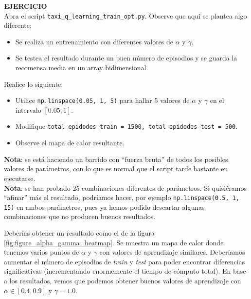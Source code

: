 \documentclass{article}
\begin{document}
\begin{exercise}
\textbf{EJERCICIO}\\
Abra el script \texttt{taxi\_q\_learning\_train\_opt.py}. Observe que aquí se plantea algo diferente: 
\begin{itemize}
    \item Se realiza un entrenamiento con diferentes valores de $\alpha$ y $\gamma$.
    \item Se testea el resultado durante un buen número de episodios y se guarda la recomensa media en un array bidimensional.
\end{itemize}

Realice lo siguiente:
\begin{itemize}
    \item Utilice \texttt{np.linspace(0.05, 1, 5)} para hallar 5 valores de $\alpha$ y $\gamma$ en el intervalo $[0.05, 1]$.
    \item Modifique \texttt{total\_epidodes\_train = 1500, total\_epidodes\_test = 500}.
    \item Observe el mapa de calor resultante.
\end{itemize}
\textbf{Nota}: se está haciendo un barrido con ``fuerza bruta'' de todos los posibles valores de parámetros, con lo que es normal que el script tarde bastante en ejecutarse.\\
\textbf{Nota}: se han probado 25 combinaciones diferentes de parámetros. Si quisiéramos ``afinar'' más el resultado, podríamos hacer, por ejemplo \texttt{np.linspace(0.5, 1, 15)} en ambos parámetros, pues ya hemos podido descartar algunas combinaciones que no producen buenos resultados.
\end{exercise}

Deberías obtener un resultado como el de la figura \ref{fig:figure_alpha_gamma_heatmap}. Se muestra un mapa de calor donde tenemos varios puntos de $\alpha$ y $\gamma$ con valores de aprendizaje similares. Deberíamos aumentar el número de episodios de \textit{train} y \textit{test} para poder encontrar diferencias significativas (incrementando enormemente el tiempo de cómputo total). En base a los resultados, vemos que podemos obtener buenos valores de aprendizaje con $\alpha \in [0.4, 0.9]$ y $\gamma=1.0$.
\end{document}
